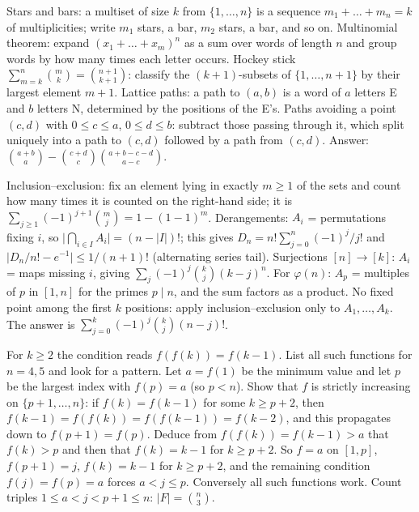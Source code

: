 \documentclass[11pt,a4paper]{article}
\begin{document}

Stars and bars: a multiset of size \(k\) from \(\{1,\dots,n\}\) is a sequence \(m_1+\dots+m_n=k\) of multiplicities; write \(m_1\) stars, a bar, \(m_2\) stars, a bar, and so on. Multinomial theorem: expand \((x_1+\dots+x_m)^n\) as a sum over words of length \(n\) and group words by how many times each letter occurs.
Hockey stick \(\sum_{m=k}^{n}\binom{m}{k}=\binom{n+1}{k+1}\): classify the \((k+1)\)-subsets of \(\{1,\dots,n+1\}\) by their largest element \(m+1\). Lattice paths: a path to \((a,b)\) is a word of \(a\) letters E and \(b\) letters N, determined by the positions of the E's.
Paths avoiding a point \((c,d)\) with \(0\le c\le a\), \(0\le d\le b\): subtract those passing through it, which split uniquely into a path to \((c,d)\) followed by a path from \((c,d)\). Answer: \(\binom{a+b}{a}-\binom{c+d}{c}\binom{a+b-c-d}{a-c}\).

Inclusion--exclusion: fix an element lying in exactly \(m\ge1\) of the sets and count how many times it is counted on the right-hand side; it is \(\sum_{j\ge1}(-1)^{j+1}\binom{m}{j}=1-(1-1)^m\).
Derangements: \(A_i\) = permutations fixing \(i\), so \(\lvert\bigcap_{i\in I}A_i\rvert=(n-\lvert I\rvert)!\); this gives \(D_n=n!\sum_{j=0}^n(-1)^j/j!\) and \(\lvert D_n/n!-e^{-1}\rvert\le 1/(n+1)!\) (alternating series tail). Surjections \([n]\to[k]\): \(A_i\) = maps missing \(i\), giving \(\sum_j(-1)^j\binom{k}{j}(k-j)^n\). For \(\varphi(n)\): \(A_p\) = multiples of \(p\) in \([1,n]\) for the primes \(p\mid n\), and the sum factors as a product.
No fixed point among the first \(k\) positions: apply inclusion--exclusion only to \(A_1,\dots,A_k\). The answer is \(\sum_{j=0}^{k}(-1)^j\binom{k}{j}(n-j)!\).

For \(k\ge2\) the condition reads \(f(f(k))=f(k-1)\). List all such functions for \(n=4,5\) and look for a pattern. Let \(a=f(1)\) be the minimum value and let \(p\) be the largest index with \(f(p)=a\) (so \(p\lt n\)).
Show that \(f\) is strictly increasing on \(\{p+1,\dots,n\}\): if \(f(k)=f(k-1)\) for some \(k\ge p+2\), then \(f(k-1)=f(f(k))=f(f(k-1))=f(k-2)\), and this propagates down to \(f(p+1)=f(p)\). Deduce from \(f(f(k))=f(k-1)\gt a\) that \(f(k)\gt p\) and then that \(f(k)=k-1\) for \(k\ge p+2\).
So \(f=a\) on \([1,p]\), \(f(p+1)=j\), \(f(k)=k-1\) for \(k\ge p+2\), and the remaining condition \(f(j)=f(p)=a\) forces \(a\lt j\le p\). Conversely all such functions work. Count triples \(1\le a\lt j\lt p+1\le n\): \(\lvert F\rvert=\binom{n}{3}\).
\end{document}
